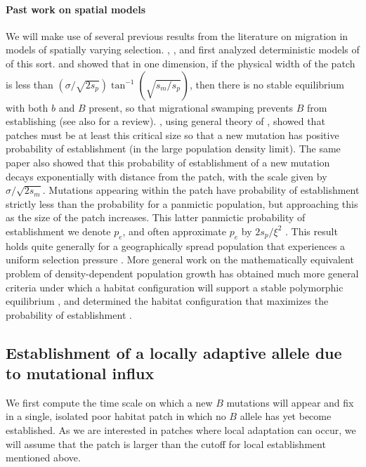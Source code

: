 \documentclass[10pt,letterpaper]{article}
\newcommand{\citep}[1]{\cite{#1}}
\newcommand{\citet}[1]{\cite{#1}}
\begin{document}
\paragraph{Past work on spatial models}
We will make use of several previous results from the literature on
migration in models of spatially varying selection.
\citet{haldane1948theory}, \citet{fisher1950frequencies}, and \citet{slatkin1973geneflow} first analyzed
deterministic models of of this sort.
\citet{nagylaki1975conditions} and \citet{conley1975application} showed that in one dimension, if the physical width of the patch is less than $(\sigma/\sqrt{2s_p}) \tan^{-1} (\sqrt{s_m/s_p})$, 
then there is no stable equilibrium with both $b$ and $B$ present,  %
so that migrational swamping prevents $B$ from establishing (see also \citet{lenormand2002limits} for a review).
\citet{barton1987establishment}, using general theory of \citet{pollak1966survival}, showed  
that patches must be at least this critical size so that a new mutation has positive probability of establishment
(in the large population density limit).
The same paper also showed that
this probability of establishment of a new mutation decays exponentially with distance from the patch, 
with the scale given by $\sigma/\sqrt{2s_m}$. 
Mutations appearing within the patch have probability of establishment
strictly less than the probability for a panmictic population,
but approaching this as the size of the patch increases.
This latter panmictic probability of establishment we denote $p_e$,
and often approximate $p_e$ by $2 s_p / \xi^2$ \citep{haldane1927mathematical,fisher1930genetical}.
This result holds quite generally for a geographically spread population that experiences a uniform selection
pressure \citep{maruyama1970fixation,cherry2003diffusion}. 
More general work on the mathematically equivalent problem of density-dependent population growth 
has obtained much more general criteria
under which a habitat configuration will support a stable polymorphic equilibrium \citep{cantrell1989diffusive},
and determined the habitat configuration that maximizes the probability of establishment \citep{lou2006minimization}.


\subsection[Establishment by Mutation]{Establishment of a locally adaptive allele due to mutational influx}
\label{ss:patchymutation}

We first compute the time scale on which a new $B$ mutations will appear and fix in 
a single, isolated poor habitat patch in which no $B$ allele has yet become established. 
As we are interested in patches where local adaptation can occur,
we will assume that the patch is larger than the cutoff for local establishment 
mentioned above.
\end{document}
